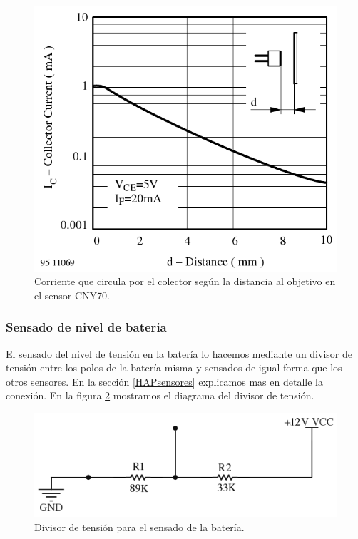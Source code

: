 \begin{figure}[ht]
	\centering
	\includegraphics[scale=0.35]{piso-IxD.png}
	\caption{Corriente que circula por el colector seg\'un la distancia al objetivo en el sensor CNY70.}
	\label{HFpisoID}
\end{figure}

\subsubsection{Sensado de nivel de bateria}
\label{HSnivelBateria}

El sensado del nivel de tensi\'on en la bater\'ia lo hacemos mediante un divisor de tensi\'on entre los polos de la bater\'ia misma
y sensados de igual forma que los otros sensores. En la secci\'on \ref{HAPsensores} explicamos mas en detalle la conexi\'on.
En la figura \ref{HFbateria} mostramos el diagrama del divisor de tensi\'on.

\begin{figure}[ht]
	\centering
	\includegraphics[scale=0.35]{bateria.png}
	\caption{Divisor de tensi\'on para el sensado de la bater\'ia.}
	\label{HFbateria}
\end{figure}

